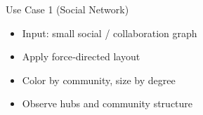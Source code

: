 \begin{frame}{Use Case 1 (Social Network)}
	\begin{itemize}
		\item Input: small social / collaboration graph
		\item Apply force‑directed layout
		\item Color by community, size by degree
		\item Observe hubs and community structure
	\end{itemize}
\end{frame}